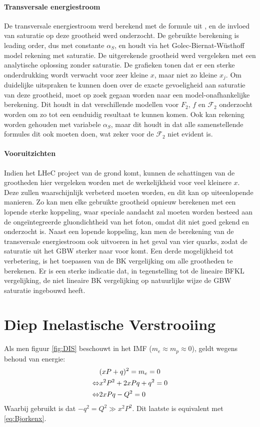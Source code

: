 \documentclass[a4paper,11pt]{article}
\numberwithin{equation}{section} %
\begin{document}
      \paragraph{Transversale energiestroom}
De transversale energiestroom werd berekend met de formule uit \cite{ET}, en de invloed van saturatie op deze grootheid werd onderzocht.
De gebruikte berekening is leading order, dus met constante $\alpha_S$, en houdt via het Golec-Biernat-Wüsthoff model rekening met saturatie.
De uitgerekende grootheid werd vergeleken met een analytische oplossing zonder saturatie.
De grafieken tonen dat er een sterke onderdrukking wordt verwacht voor zeer kleine $x$, maar niet zo kleine $x_j$.
Om duidelijke uitspraken te kunnen doen over de exacte gevoeligheid aan saturatie van deze grootheid, moet op zoek gegaan worden naar een model-onafhankelijke berekening.
Dit houdt in dat verschillende modellen voor $F_2$, $f$ en $\mathcal{F}_2$ onderzocht worden om zo tot een eenduidig resultaat te kunnen komen.
Ook kan rekening worden gehouden met variabele $\alpha_S$, maar dit houdt in dat alle samenstellende formules dit ook moeten doen, wat zeker voor de $\mathcal{F}_2$ niet evident is.

      \paragraph{Vooruitzichten}
Indien het LHeC project van de grond komt, kunnen de schattingen van de grootheden hier vergeleken worden met de werkelijkheid voor veel kleinere $x$.
Deze zullen waarschijnlijk verbeterd moeten worden, en dit kan op uiteenlopende manieren.
Zo kan men elke gebruikte grootheid opnieuw berekenen met een lopende sterke koppeling, waar speciale aandacht zal moeten worden besteed aan de ongeïntegreerde gluondichtheid van het foton, omdat dit niet goed gekend en onderzocht is.
Naast een lopende koppeling, kan men de berekening van de transversale energiestroom ook uitvoeren in het geval van vier quarks, zodat de saturatie uit het GBW sterker naar voor komt.
Een derde mogelijkheid tot verbetering, is het toepassen van de BK vergelijking om alle grootheden te berekenen.
Er is een sterke indicatie \cite{Kutak} dat, in tegenstelling tot de lineaire BFKL vergelijking, de niet lineaire BK vergelijking op natuurlijke wijze de GBW saturatie ingebouwd heeft.

\newpage


\appendix
\section{Diep Inelastische Verstrooiing} \label{app:DIS}
Als men figuur \ref{fig:DIS} beschouwt in het IMF ($m_e \approx m_p \approx 0$), geldt wegens behoud van energie:
\begin{align}
&(xP+q)^2 = m_e = 0 \notag \\
\Leftrightarrow &x^2 P^2 + 2xPq + q^2 = 0 \notag \\
\Leftrightarrow &2xPq -Q^2=0
\end{align}
Waarbij gebruikt is dat $-q^2 = Q^2 \gg x^2P^2$. Dit laatste is equivalent met \eqref{eq:Bjorkenx}.
\end{document}
